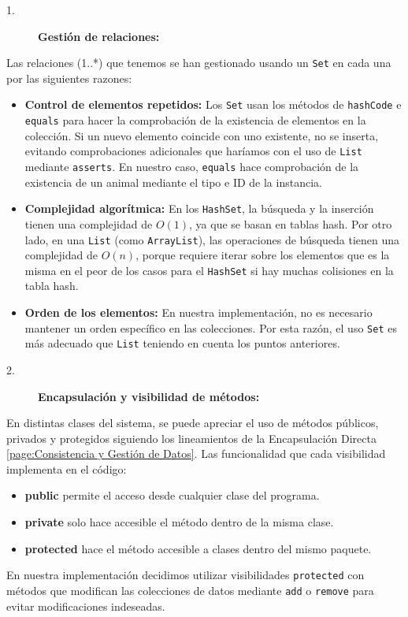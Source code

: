 \begin{description}
    \item[1.] \textbf{Gestión de relaciones:}
\end{description}
Las relaciones (1..*) que tenemos se han gestionado usando un \texttt{Set} en cada una por las siguientes razones:
\begin{itemize}
    \item \textbf{Control de elementos repetidos:} Los \texttt{Set} usan los métodos de \texttt{hashCode} e \texttt{equals}
    para hacer la comprobación de la existencia de elementos en la colección. Si un nuevo elemento coincide con uno existente, 
    no se inserta, evitando comprobaciones adicionales que haríamos con el uso de \texttt{List} mediante \texttt{asserts}. En 
    nuestro caso, \texttt{equals} hace comprobación de la existencia de un animal mediante el tipo e ID de la instancia.
    \item \textbf{Complejidad algorítmica:} En los \texttt{HashSet}, la búsqueda y la inserción tienen una complejidad de \(O(1)\), 
    ya que se basan en tablas hash. Por otro lado, en una \texttt{List} (como \texttt{ArrayList}), las operaciones de búsqueda tienen una 
    complejidad de \(O(n)\), porque requiere iterar sobre los elementos que es la misma en el peor de los casos para el \texttt{HashSet} si hay muchas colisiones en la tabla hash.
    \item \textbf{Orden de los elementos:} En nuestra implementación, no es necesario mantener un orden específico en las colecciones. 
    Por esta razón, el uso \texttt{Set} es más adecuado que \texttt{List} teniendo en cuenta los puntos anteriores.
\end{itemize}

\begin{description}
    \item[2.] \textbf{Encapsulación y visibilidad de métodos:}
\end{description}
En distintas clases del sistema, se puede apreciar el uso de métodos públicos, privados y protegidos siguiendo los lineamientos de la Encapsulación Directa \ref{page:Consistencia y Gestión de Datos}.
Las funcionalidad que cada visibilidad implementa en el código:
\begin{itemize}
    \item \textbf{public} permite el acceso desde cualquier clase del programa.
    \item \textbf{private} solo hace accesible el método dentro de la misma clase.
    \item \textbf{protected} hace el método accesible a clases dentro del mismo paquete.
\end{itemize}
En nuestra implementación decidimos utilizar visibilidades \texttt{protected} con métodos que modifican las colecciones de datos mediante \texttt{add} o \texttt{remove} 
para evitar modificaciones indeseadas.\par
\vspace{0.20cm}

